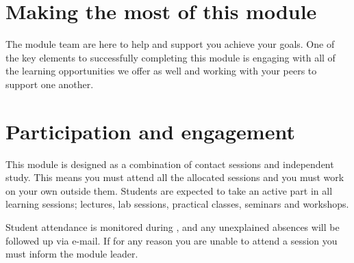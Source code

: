 \documentclass{MDXHandbook}
\begin{document}





\section{Making the most of this module}

The module team are here to help and support you achieve your goals. One of the key elements to successfully completing this module is engaging with all of the learning opportunities we offer as well and working with your peers to support one another. 

\section*{Participation and engagement}

This module is designed as a combination of contact sessions and independent study. This means you must attend all the allocated sessions and you must work on your own outside them. Students are expected to take an active part in all learning sessions;  lectures, lab sessions, practical classes, seminars and workshops. 

Student attendance is monitored during  , and any unexplained absences will be followed up via e-mail. If for any reason you are unable to attend a session you must inform the module leader.

\end{document}

